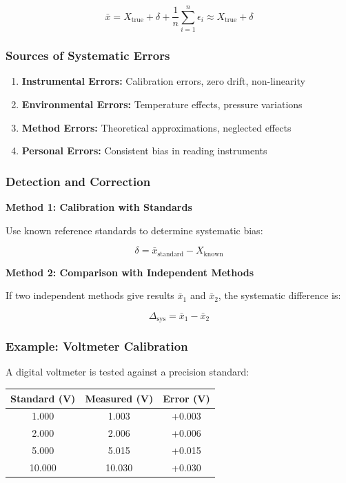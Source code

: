 \documentclass[twoside]{book}
\begin{document}
\begin{equation*}
\bar{x} = X_{\text{true}} + \delta + \frac{1}{n}\sum_{i=1}^{n}\epsilon_i \approx X_{\text{true}} + \delta
\end{equation*}

\subsubsection{Sources of Systematic Errors}

\begin{enumerate}
\item \textbf{Instrumental Errors:} Calibration errors, zero drift, non-linearity
\item \textbf{Environmental Errors:} Temperature effects, pressure variations
\item \textbf{Method Errors:} Theoretical approximations, neglected effects
\item \textbf{Personal Errors:} Consistent bias in reading instruments
\end{enumerate}

\subsubsection{Detection and Correction}

\textbf{Method 1: Calibration with Standards}

Use known reference standards to determine systematic bias:

\begin{equation*}
\delta = \bar{x}_{\text{standard}} - X_{\text{known}}
\end{equation*}

\textbf{Method 2: Comparison with Independent Methods}

If two independent methods give results $\bar{x}_1$ and $\bar{x}_2$, the systematic difference is:

\begin{equation*}
\Delta_{\text{sys}} = \bar{x}_1 - \bar{x}_2
\end{equation*}

\subsubsection{Example: Voltmeter Calibration}

A digital voltmeter is tested against a precision standard:

\begin{center}
\begin{tabular}{ccc}
\toprule
Standard (V) & Measured (V) & Error (V) \\
\midrule
1.000 & 1.003 & +0.003 \\
2.000 & 2.006 & +0.006 \\
5.000 & 5.015 & +0.015 \\
10.000 & 10.030 & +0.030 \\
\bottomrule
\end{tabular}
\end{center}
\end{document}
